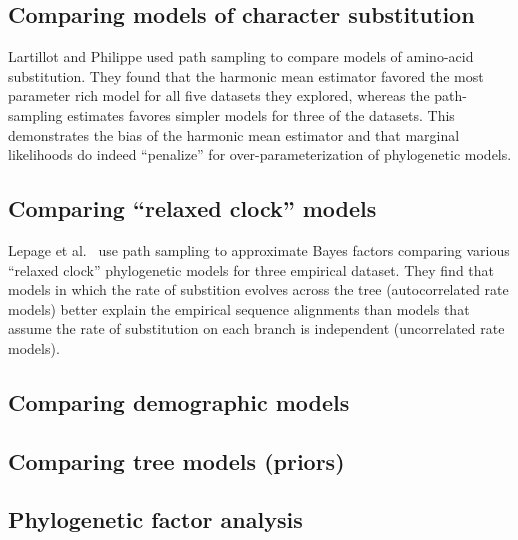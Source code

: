 \subsection{Comparing models of character substitution}

Lartillot and Philippe \citeyear{Lartillot2006} used path sampling to compare
models of amino-acid substitution.
They found that the harmonic mean estimator favored the most parameter rich
model for all five datasets they explored, whereas the path-sampling estimates
favores simpler models for three of the datasets.
This demonstrates the bias of the harmonic mean estimator and that marginal
likelihoods do indeed ``penalize'' for over-parameterization of phylogenetic
models.

\subsection{Comparing ``relaxed clock'' models}

Lepage et al.\ \citeyear{Lepage2007} use path sampling to approximate Bayes
factors comparing various ``relaxed clock'' phylogenetic models for
three empirical dataset.
They find that models in which the rate of substition evolves across 
the tree (autocorrelated rate models) better explain the empirical
sequence alignments than models that assume the rate of substitution
on each branch is independent (uncorrelated rate models).

\citep{Baele2012}

\citep{Baele2013MBE}

\subsection{Comparing demographic models}

\citep{Baele2012}

\subsection{Comparing tree models (priors)}

\subsection{Phylogenetic factor analysis}

